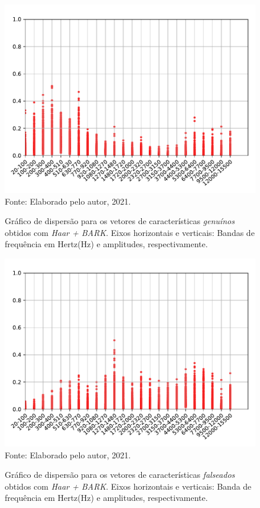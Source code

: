 \begin{figure}[H]
	\centering
	\caption{Gráfico de dispersão para os vetores de características \textit{genuínos} obtidos com \textit{Haar + BARK}. Eixos horizontais e verticais: Bandas de frequência em Hertz(Hz) e amplitudes, respectivamente.}
	\includegraphics[scale=.75]{./images/results/barkVersusMel/Genuine_haar_Bark.pdf}
	\label{fig:livehaarbark}
	\\Fonte: Elaborado pelo autor, 2021.
\end{figure}
\begin{figure}[H]
	\centering
	\caption{Gráfico de dispersão para os vetores de características \textit{falseados} obtidos com \textit{Haar + BARK}. Eixos horizontais e verticais: Banda de frequência em Hertz(Hz) e amplitudes, respectivamente.}
	\includegraphics[scale=.75]{./images/results/barkVersusMel/Spoofing_haar_Bark.pdf}
	\label{fig:spoofinghaarbark}
	\\Fonte: Elaborado pelo autor, 2021.
\end{figure}
